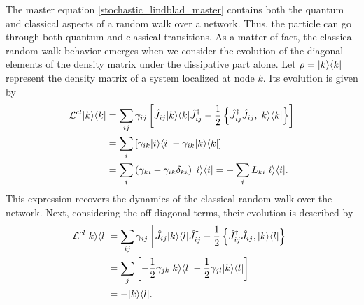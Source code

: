The master equation \eqref{stochastic_lindblad_master} contains both the quantum and classical aspects of a random walk over a network. Thus, the particle can go through both quantum and classical transitions. As a matter of fact, the classical random walk behavior emerges when we consider the evolution of the diagonal elements of the density matrix under the dissipative part alone. Let $\rho = \lvert k\rangle\langle k\rvert$ represent the density matrix of a system localized at node $k$. Its evolution is given by
\begin{equation}
    \begin{split}
        \mathcal{L}^{cl}\lvert k\rangle\langle k\rvert &= \sum_{ij}\gamma_{ij}\left[\hat J_{ij} \lvert k\rangle\langle k\rvert\hat J_{ij}^\dagger -\frac{1}{2} \left\{ \hat J_{ij}^\dagger \hat J_{ij}, \lvert k\rangle\langle k\rvert\right\}\right]\\
        &= \sum_{i}\left[\gamma_{ik} \lvert i\rangle\langle i\rvert -\gamma_{ik}\lvert k\rangle\langle k\rvert\right]\\
        &=\sum_{i} \left(\gamma_{ki} - \gamma_{ik}\delta_{ki}\right) \lvert i\rangle\langle i\rvert = -\sum_i L_{ki} \lvert i\rangle\langle i\rvert.
    \end{split} 
\end{equation} 
This expression recovers the dynamics of the classical random walk over the network.
Next, considering the off-diagonal terms, their evolution is described by
\begin{equation}
    \begin{split}
        \mathcal{L}^{cl}\lvert k\rangle\langle l\rvert &= \sum_{ij}\gamma_{ij}\left[\hat J_{ij} \lvert k\rangle\langle l\rvert\hat J_{ij}^\dagger -\frac{1}{2} \left\{ \hat J_{ij}^\dagger \hat J_{ij}, \lvert k\rangle\langle l\rvert\right\}\right]\\
        &= \sum_{j}\left[-\frac{1}{2} \gamma_{jk}\lvert k\rangle\langle l\rvert - \frac{1}{2} \gamma_{jl}\lvert k\rangle\langle l\rvert\right]\\
        &= -\lvert k\rangle\langle l\rvert.
    \end{split} 
\end{equation}

